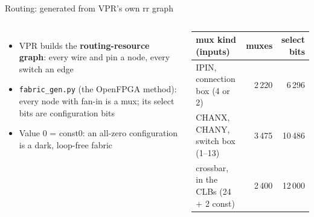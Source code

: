 \documentclass[aspectratio=169,11pt]{beamer}
\begin{document}
\begin{frame}{Routing: generated from VPR's own rr graph}
\begin{columns}[c]
    \vspace{2mm}
    \footnotesize
    \begin{itemize}
      \item VPR builds the \textbf{routing-resource graph}: every wire and pin a node, every switch an edge
      \item \texttt{fabric\_gen.py} (the OpenFPGA method): \alert{every node with fan-in is a mux}; its select bits are configuration bits
      \item Value 0 = const0: an all-zero configuration is a dark, loop-free fabric
    \end{itemize}
    \vspace{2mm}
    \centering
    \scriptsize
    \begin{tabular}{@{}lrr@{}}
      \toprule
      mux kind (inputs) & muxes & select bits \\
      \midrule
      IPIN, connection box (4 or 2) & 2\,220 & 6\,296 \\
      CHANX, CHANY, switch box (1--13) & 3\,475 & 10\,486 \\
      crossbar, in the CLBs (24 + 2 const) & 2\,400 & 12\,000 \\
      \bottomrule
    \end{tabular}
  \end{columns}
\end{frame}
\end{document}

